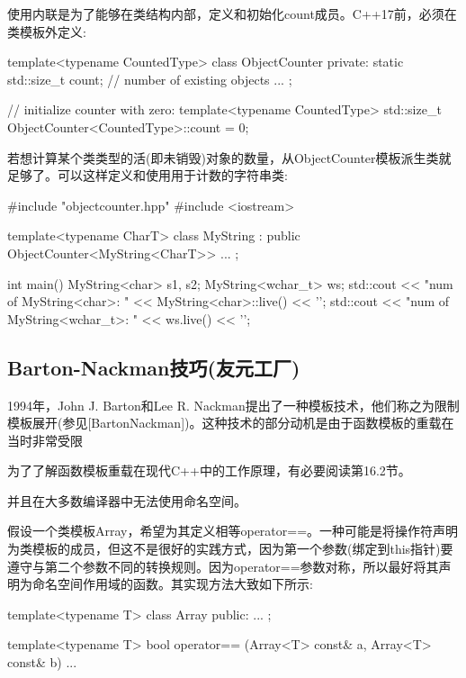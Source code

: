 使用内联是为了能够在类结构内部，定义和初始化count成员。C++17前，必须在类模板外定义:

\begin{cpp}
template<typename CountedType>
class ObjectCounter {
	private:
	static std::size_t count; // number of existing objects
	...
};

// initialize counter with zero:
template<typename CountedType>
std::size_t ObjectCounter<CountedType>::count = 0;
\end{cpp}

若想计算某个类类型的活(即未销毁)对象的数量，从ObjectCounter模板派生类就足够了。可以这样定义和使用用于计数的字符串类:

\begin{cpp}
#include "objectcounter.hpp"
#include <iostream>

template<typename CharT>
class MyString : public ObjectCounter<MyString<CharT>> {
	...
};

int main()
{
	MyString<char> s1, s2;
	MyString<wchar_t> ws;
	std::cout << "num of MyString<char>: "
				<< MyString<char>::live() << '\n';
	std::cout << "num of MyString<wchar_t>: "
				<< ws.live() << '\n';
}
\end{cpp}

\subsection{Barton-Nackman技巧(友元工厂)}

1994年，John J. Barton和Lee R. Nackman提出了一种模板技术，他们称之为限制模板展开(参见[BartonNackman])。这种技术的部分动机是由于函数模板的重载在当时非常受限

\begin{notice}
为了了解函数模板重载在现代C++中的工作原理，有必要阅读第16.2节。
\end{notice}

并且在大多数编译器中无法使用命名空间。

假设一个类模板Array，希望为其定义相等operator==。一种可能是将操作符声明为类模板的成员，但这不是很好的实践方式，因为第一个参数(绑定到this指针)要遵守与第二个参数不同的转换规则。因为operator==参数对称，所以最好将其声明为命名空间作用域的函数。其实现方法大致如下所示:

\begin{cpp}
template<typename T>
class Array {
	public:
	...
};

template<typename T>
bool operator== (Array<T> const& a, Array<T> const& b)
{
	...
}
\end{cpp}

